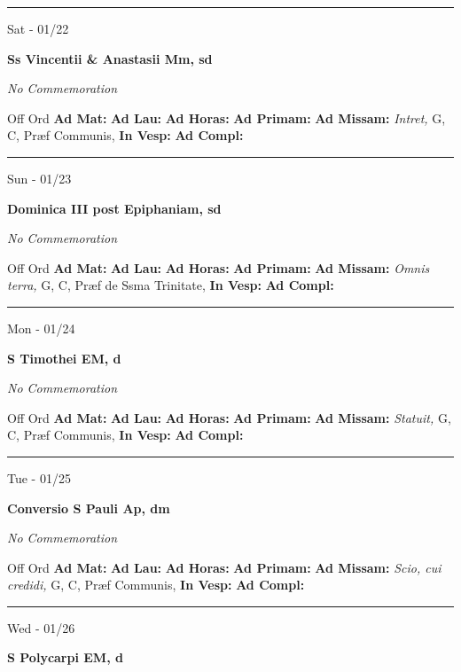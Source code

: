 \documentclass[letterpaper, 10pt]{article}
\begin{document}
\hrule
\begin{center}
Sat - 01/22
\end{center}\textbf{ \large Ss Vincentii \& Anastasii Mm, \textnormal{\normalsize sd}}

\textit{No Commemoration}\begin{justify}
Off Ord
\textbf{Ad Mat: }
\textbf{Ad Lau: }
\textbf{Ad Horas: }
\textbf{Ad Primam: }
\textbf{Ad Missam:} \textit{Intret, } G, C, Præf Communis, 
\textbf{In Vesp: }
\textbf{Ad Compl: }\end{justify}



\hrule
\begin{center}
Sun - 01/23
\end{center}\textbf{ \large Dominica III post Epiphaniam, \textnormal{\normalsize sd}}

\textit{No Commemoration}\begin{justify}
Off Ord
\textbf{Ad Mat: }
\textbf{Ad Lau: }
\textbf{Ad Horas: }
\textbf{Ad Primam: }
\textbf{Ad Missam:} \textit{Omnis terra, } G, C, Præf de Ssma Trinitate, 
\textbf{In Vesp: }
\textbf{Ad Compl: }\end{justify}



\hrule
\begin{center}
Mon - 01/24
\end{center}\textbf{ \large S Timothei EM, \textnormal{\normalsize d}}

\textit{No Commemoration}\begin{justify}
Off Ord
\textbf{Ad Mat: }
\textbf{Ad Lau: }
\textbf{Ad Horas: }
\textbf{Ad Primam: }
\textbf{Ad Missam:} \textit{Statuit, } G, C, Præf Communis, 
\textbf{In Vesp: }
\textbf{Ad Compl: }\end{justify}



\hrule
\begin{center}
Tue - 01/25
\end{center}\textbf{ \large Conversio S Pauli Ap, \textnormal{\normalsize dm}}

\textit{No Commemoration}\begin{justify}
Off Ord
\textbf{Ad Mat: }
\textbf{Ad Lau: }
\textbf{Ad Horas: }
\textbf{Ad Primam: }
\textbf{Ad Missam:} \textit{Scio, cui credidi, } G, C, Præf Communis, 
\textbf{In Vesp: }
\textbf{Ad Compl: }\end{justify}



\hrule
\begin{center}
Wed - 01/26
\end{center}\textbf{ \large S Polycarpi EM, \textnormal{\normalsize d}}
\end{document}
